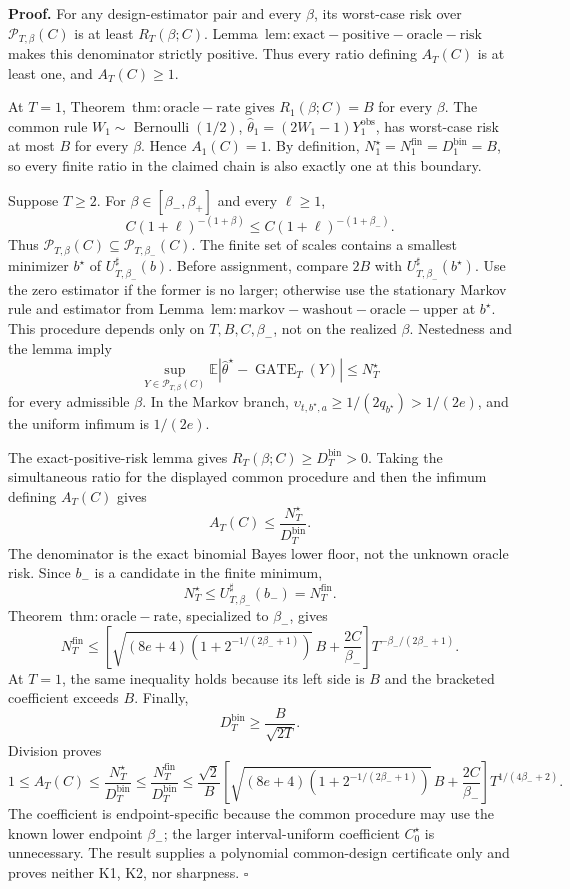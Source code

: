 \textbf{Proof.} For any design-estimator pair and every \(\beta\), its worst-case risk over \(\mathcal P_{T,\beta}(C)\) is at least \(R_T(\beta;C)\). Lemma~\(\mathrm{lem:exact-positive-oracle-risk}\) makes this denominator strictly positive. Thus every ratio defining \(A_T(C)\) is at least one, and \(A_T(C)\ge1\).

At \(T=1\), Theorem~\(\mathrm{thm:oracle-rate}\) gives \(R_1(\beta;C)=B\) for every \(\beta\). The common rule \(W_1\sim\operatorname{Bernoulli}(1/2)\), \(\widehat\theta_1=(2W_1-1)Y_1^{\mathrm{obs}}\), has worst-case risk at most \(B\) for every \(\beta\). Hence \(A_1(C)=1\). By definition, \(N_1^\star=N_1^{\mathrm{fin}}=D_1^{\mathrm{bin}}=B\), so every finite ratio in the claimed chain is also exactly one at this boundary.

Suppose \(T\ge2\). For \(\beta\in[\beta_-,\beta_+]\) and every \(\ell\ge1\),
\[
C(1+\ell)^{-(1+\beta)}\le C(1+\ell)^{-(1+\beta_-)}.
\]
Thus \(\mathcal P_{T,\beta}(C)\subseteq\mathcal P_{T,\beta_-}(C)\). The finite set of scales contains a smallest minimizer \(b^\star\) of \(U_{T,\beta_-}^{\sharp}(b)\). Before assignment, compare \(2B\) with \(U_{T,\beta_-}^{\sharp}(b^\star)\). Use the zero estimator if the former is no larger; otherwise use the stationary Markov rule and estimator from Lemma~\(\mathrm{lem:markov-washout-oracle-upper}\) at \(b^\star\). This procedure depends only on \(T,B,C,\beta_-\), not on the realized \(\beta\). Nestedness and the lemma imply
\[
\sup_{Y\in\mathcal P_{T,\beta}(C)}
\mathbb E|\widehat\theta^\star-\operatorname{GATE}_T(Y)|
\le N_T^\star
\]
for every admissible \(\beta\). In the Markov branch, \(\upsilon_{t,b^\star,a}\ge1/(2q_{b^\star})>1/(2e)\), and the uniform infimum is \(1/(2e)\).

The exact-positive-risk lemma gives \(R_T(\beta;C)\ge D_T^{\mathrm{bin}}>0\). Taking the simultaneous ratio for the displayed common procedure and then the infimum defining \(A_T(C)\) gives
\[
A_T(C)\le\frac{N_T^\star}{D_T^{\mathrm{bin}}}.
\]
The denominator is the exact binomial Bayes lower floor, not the unknown oracle risk. Since \(b_-\) is a candidate in the finite minimum,
\[
N_T^\star\le U_{T,\beta_-}^{\sharp}(b_-)=N_T^{\mathrm{fin}}.
\]
Theorem~\(\mathrm{thm:oracle-rate}\), specialized to \(\beta_-\), gives
\[
N_T^{\mathrm{fin}}
\le\left[\sqrt{(8e+4)\left(1+2^{-1/(2\beta_-+1)}\right)}\,B+\frac{2C}{\beta_-}\right]T^{-\beta_-/(2\beta_-+1)}.
\]
At \(T=1\), the same inequality holds because its left side is \(B\) and the bracketed coefficient exceeds \(B\). Finally,
\[
D_T^{\mathrm{bin}}\ge\frac{B}{\sqrt{2T}}.
\]
Division proves
\[
1\le A_T(C)\le\frac{N_T^\star}{D_T^{\mathrm{bin}}}
\le\frac{N_T^{\mathrm{fin}}}{D_T^{\mathrm{bin}}}
\le\frac{\sqrt2}{B}
\left[\sqrt{(8e+4)\left(1+2^{-1/(2\beta_-+1)}\right)}\,B+\frac{2C}{\beta_-}\right]T^{1/(4\beta_-+2)}.
\]
The coefficient is endpoint-specific because the common procedure may use the known lower endpoint \(\beta_-\); the larger interval-uniform coefficient \(C_0^\star\) is unnecessary. The result supplies a polynomial common-design certificate only and proves neither K1, K2, nor sharpness. \(\square\)